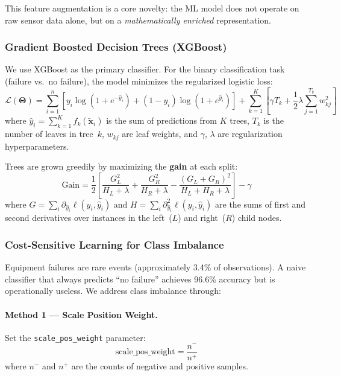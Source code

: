 \documentclass[12pt, a4paper]{article}
\begin{document}
This feature augmentation is a core novelty: the ML model does not operate on raw sensor data alone, but on a \textit{mathematically enriched} representation.

\subsubsection{Gradient Boosted Decision Trees (XGBoost)}

We use XGBoost \citep{chen2016} as the primary classifier. For the binary classification task (failure vs.\ no failure), the model minimizes the regularized logistic loss:
\begin{equation}\label{eq:xgboost-loss}
    \mathcal{L}(\boldsymbol{\Theta}) = \sum_{i=1}^{n}\left[y_i\log(1 + e^{-\hat{y}_i}) + (1-y_i)\log(1 + e^{\hat{y}_i})\right] + \sum_{k=1}^{K}\left[\gamma T_k + \frac{1}{2}\lambda\sum_{j=1}^{T_k}w_{kj}^2\right]
\end{equation}
where $\hat{y}_i = \sum_{k=1}^{K}f_k(\tilde{\mathbf{x}}_i)$ is the sum of predictions from $K$ trees, $T_k$ is the number of leaves in tree~$k$, $w_{kj}$ are leaf weights, and $\gamma$, $\lambda$ are regularization hyperparameters.

Trees are grown greedily by maximizing the \textbf{gain} at each split:
\begin{equation}\label{eq:gain}
    \mathrm{Gain} = \frac{1}{2}\left[\frac{G_L^2}{H_L + \lambda} + \frac{G_R^2}{H_R + \lambda} - \frac{(G_L + G_R)^2}{H_L + H_R + \lambda}\right] - \gamma
\end{equation}
where $G = \sum_i \partial_{\hat{y}_i}\ell(y_i, \hat{y}_i)$ and $H = \sum_i \partial^2_{\hat{y}_i}\ell(y_i, \hat{y}_i)$ are the sums of first and second derivatives over instances in the left~($L$) and right~($R$) child nodes.

\subsubsection{Cost-Sensitive Learning for Class Imbalance}

Equipment failures are rare events (approximately 3.4\% of observations). A naive classifier that always predicts ``no failure'' achieves 96.6\% accuracy but is operationally useless. We address class imbalance through:

\paragraph{Method 1 --- Scale Position Weight.} Set the \texttt{scale\_pos\_weight} parameter:
\begin{equation}
    \mathrm{scale\_pos\_weight} = \frac{n^-}{n^+}
\end{equation}
where $n^-$ and $n^+$ are the counts of negative and positive samples.
\end{document}
